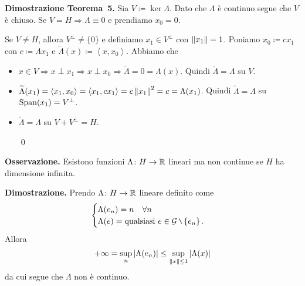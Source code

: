 \textbf{Dimostrazione Teorema~5.}
Sia $V \coloneqq \ker \Lambda$. Dato che $\Lambda$ è continuo segue che $V$ è chiuso.
Se $V = H \Longrightarrow \Lambda \equiv 0$ e prendiamo $x_0 = 0$.

Se $V \neq H$, allora $V^\perp \neq \{0\}$ e definiamo $x_1 \in V^\perp$ con $\left\lVert x_1 \right\rVert = 1$.
Poniamo $x_0 \coloneqq  c x_1$ con $c \coloneqq  \Lambda x_1$ e $\tilde{\Lambda}(x) \coloneqq \left<x,x_0 \right>$. Abbiamo che
\begin{itemize}

	\item $x \in V \Longrightarrow x \perp x_1 \Longrightarrow x \perp x_0 \Longrightarrow \tilde{\Lambda} = 0 = \Lambda(x)$. Quindi $\tilde{\Lambda} = \Lambda$ su $V$.

	\item $\widetilde{\Lambda}(x_1) = \left<x_1,x_0 \right> = \left<x_1, c x_1 \right> = c \left\lVert x_1 \right\rVert^2 = c = \Lambda(x_1)$. Quindi $\tilde{\Lambda} = \Lambda$ su $\operatorname{Span}(x_1) = V^\perp$.

	\item $\tilde{\Lambda} = \Lambda$ su $V + V^\perp = H$.

\qed
\end{itemize}

\textbf{Osservazione.}
Esistono funzioni $\Lambda \colon  H \to \mathbb R$ lineari ma non continue se $H$ ha dimensione infinita.

\textbf{Dimostrazione.} Prendo $\Lambda \colon H \to \mathbb R$ lineare definito come
%
$$
	\begin{cases}
	\Lambda(e_n) = n \quad \forall n \\
	\Lambda(e) = \text{qualsiasi } e \in \mc{G} \setminus \left\{ e_n \right\}.
	\end{cases} 
$$
%
Allora
%
$$
	+\infty = \sup_n \left| \Lambda(e_n) \right| \leq \sup_{\left\lVert x \right\rVert \leq 1} \left| \Lambda(x) \right| 
$$
%
da cui segue che $\Lambda$ non è continuo.
